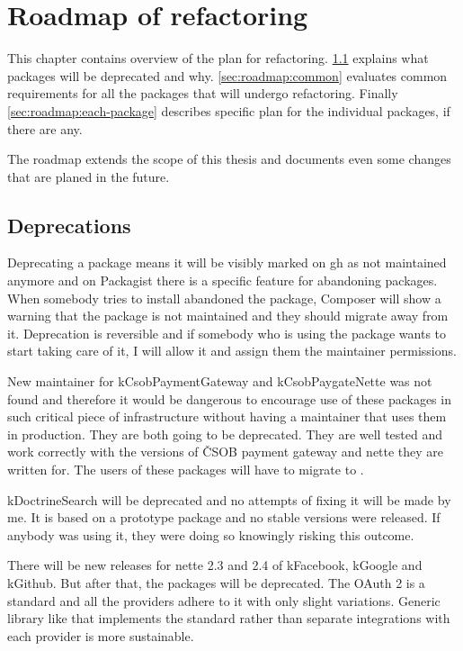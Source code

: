 \chapter{Roadmap of refactoring}

This chapter contains overview of the plan for refactoring. \ref{sec:roadmap:deprecations} explains what packages will be deprecated and why. \ref{sec:roadmap:common} evaluates common requirements for all the packages that will undergo refactoring. Finally \ref{sec:roadmap:each-package} describes specific plan for the individual packages, if there are any.

The roadmap extends the scope of this thesis and documents even some changes that are planed in the future.

\section{Deprecations} \label{sec:roadmap:deprecations}

Deprecating a package means it will be visibly marked on \gls{gh} as not maintained anymore and on Packagist there is a specific feature for abandoning packages. When somebody tries to install abandoned the package, Composer will show a warning that the package is not maintained and they should migrate away from it. Deprecation is reversible and if somebody who is using the package wants to start taking care of it, I will allow it and assign them the maintainer permissions.

New maintainer for \gls{kCsobPaymentGateway} and \gls{kCsobPaygateNette} was not found and therefore it would be dangerous to encourage use of these packages in such critical piece of infrastructure without having a maintainer that uses them in production. They are both going to be deprecated. They are well tested and work correctly with the versions of ČSOB payment gateway and \gls{nette} they are written for. The users of these packages will have to migrate to .

\gls{kDoctrineSearch} will be deprecated and no attempts of fixing it will be made by me. It is based on a prototype package and no stable versions were released. If anybody was using it, they were doing so knowingly risking this outcome.

There will be new releases for \gls{nette} 2.3 and 2.4 of \gls{kFacebook}, \gls{kGoogle} and \gls{kGithub}. But after that, the packages will be deprecated. The OAuth 2 is a standard and all the providers adhere to it with only slight variations. Generic library like  that implements the standard rather than separate integrations with each provider is more sustainable.

